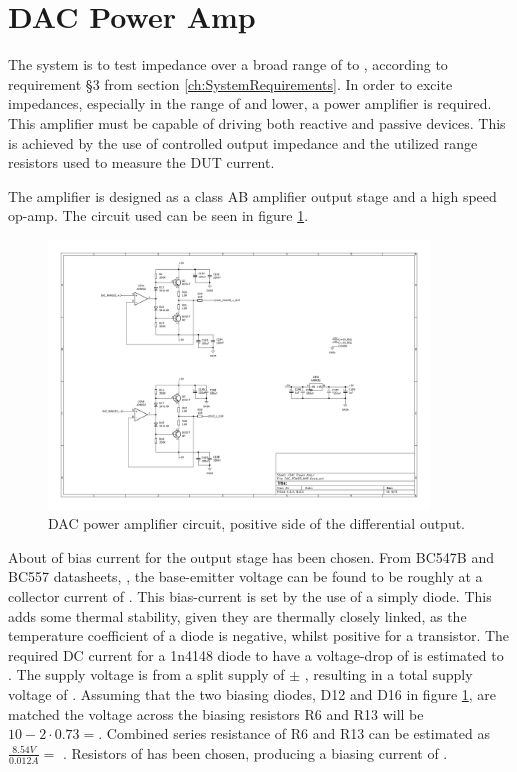 \section{DAC Power Amp} \label{subsec:DAC_Filter}
The system is to test impedance over a broad range of  to , according to requirement §3 from section \ref{ch:SystemRequirements}. In order to excite impedances, especially in the range of  and lower, a power amplifier is required. This amplifier must be capable of driving both reactive and passive devices. This is achieved by the use of controlled output impedance and the utilized range resistors used to measure the DUT current. 

The amplifier is designed as a class AB amplifier output stage and a high speed op-amp. The circuit used can be seen in figure \ref{fig_7_1_1_5_DAC_POWER_AMP}.

\begin{figure}[H]
    \centering
    \includegraphics[clip, trim=150 320 415 40, width=0.9\textwidth]{Sections/7_SystemDesign/Figures/7_1_1_5_DAC Power Amp.pdf}
    \caption{DAC power amplifier circuit, positive side of the differential output.}
    \label{fig_7_1_1_5_DAC_POWER_AMP}
\end{figure}

About  of bias current for the output stage has been chosen. From BC547B and BC557 datasheets, \cite{BC547_datasheet} \cite{BC557_datasheet}, the base-emitter voltage can be found to be roughly  at a collector current of . This bias-current is set by the use of a simply diode. This adds some thermal stability, given they are thermally closely linked, as the temperature coefficient of a diode is negative, whilst positive for a transistor. The required DC current for a 1n4148 diode to have a voltage-drop of  is estimated to . The supply voltage is from a split supply of $\pm$ , resulting in a total supply voltage of . Assuming that the two biasing diodes, D12 and D16 in figure \ref{fig_7_1_1_5_DAC_POWER_AMP}, are matched the voltage across the biasing resistors R6 and R13 will be $10-2\cdot0.73 = $. Combined series resistance of R6 and R13 can be estimated as $\frac{8.54 V}{0.012 A} = $ . Resistors of  has been chosen, producing a biasing current of .

